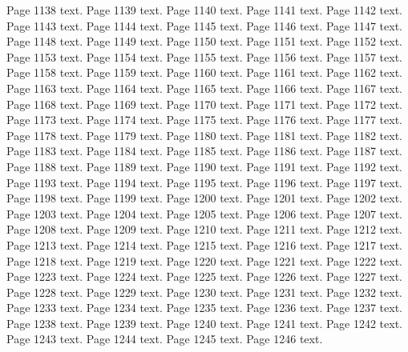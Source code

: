 \documentclass{article}
\begin{document}
Page 1138 text.\newpage
Page 1139 text.\newpage
Page 1140 text.\newpage
Page 1141 text.\newpage
Page 1142 text.\newpage
Page 1143 text.\newpage
Page 1144 text.\newpage
Page 1145 text.\newpage
Page 1146 text.\newpage
Page 1147 text.\newpage
Page 1148 text.\newpage
Page 1149 text.\newpage
Page 1150 text.\newpage
Page 1151 text.\newpage
Page 1152 text.\newpage
Page 1153 text.\newpage
Page 1154 text.\newpage
Page 1155 text.\newpage
Page 1156 text.\newpage
Page 1157 text.\newpage
Page 1158 text.\newpage
Page 1159 text.\newpage
Page 1160 text.\newpage
Page 1161 text.\newpage
Page 1162 text.\newpage
Page 1163 text.\newpage
Page 1164 text.\newpage
Page 1165 text.\newpage
Page 1166 text.\newpage
Page 1167 text.\newpage
Page 1168 text.\newpage
Page 1169 text.\newpage
Page 1170 text.\newpage
Page 1171 text.\newpage
Page 1172 text.\newpage
Page 1173 text.\newpage
Page 1174 text.\newpage
Page 1175 text.\newpage
Page 1176 text.\newpage
Page 1177 text.\newpage
Page 1178 text.\newpage
Page 1179 text.\newpage
Page 1180 text.\newpage
Page 1181 text.\newpage
Page 1182 text.\newpage
Page 1183 text.\newpage
Page 1184 text.\newpage
Page 1185 text.\newpage
Page 1186 text.\newpage
Page 1187 text.\newpage
Page 1188 text.\newpage
Page 1189 text.\newpage
Page 1190 text.\newpage
Page 1191 text.\newpage
Page 1192 text.\newpage
Page 1193 text.\newpage
Page 1194 text.\newpage
Page 1195 text.\newpage
Page 1196 text.\newpage
Page 1197 text.\newpage
Page 1198 text.\newpage
Page 1199 text.\newpage
Page 1200 text.\newpage
Page 1201 text.\newpage
Page 1202 text.\newpage
Page 1203 text.\newpage
Page 1204 text.\newpage
Page 1205 text.\newpage
Page 1206 text.\newpage
Page 1207 text.\newpage
Page 1208 text.\newpage
Page 1209 text.\newpage
Page 1210 text.\newpage
Page 1211 text.\newpage
Page 1212 text.\newpage
Page 1213 text.\newpage
Page 1214 text.\newpage
Page 1215 text.\newpage
Page 1216 text.\newpage
Page 1217 text.\newpage
Page 1218 text.\newpage
Page 1219 text.\newpage
Page 1220 text.\newpage
Page 1221 text.\newpage
Page 1222 text.\newpage
Page 1223 text.\newpage
Page 1224 text.\newpage
Page 1225 text.\newpage
Page 1226 text.\newpage
Page 1227 text.\newpage
Page 1228 text.\newpage
Page 1229 text.\newpage
Page 1230 text.\newpage
Page 1231 text.\newpage
Page 1232 text.\newpage
Page 1233 text.\newpage
Page 1234 text.\newpage
Page 1235 text.\newpage
Page 1236 text.\newpage
Page 1237 text.\newpage
Page 1238 text.\newpage
Page 1239 text.\newpage
Page 1240 text.\newpage
Page 1241 text.\newpage
Page 1242 text.\newpage
Page 1243 text.\newpage
Page 1244 text.\newpage
Page 1245 text.\newpage
Page 1246 text.\newpage
\end{document}
